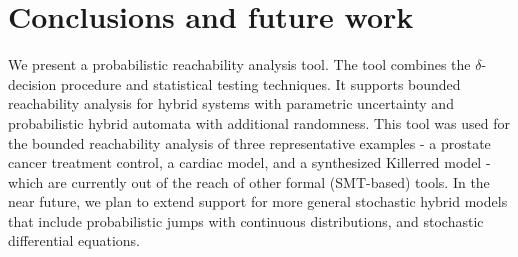 \section{Conclusions and future work}
We present a probabilistic reachability analysis tool. The tool combines the $\delta$-decision 
procedure \cite{gao2013dreal, gao2013satisfiability, gaodelta} and statistical testing techniques. 
It supports bounded reachability analysis for hybrid systems with parametric 
uncertainty and probabilistic hybrid automata with additional randomness. This tool was used for the bounded reachability analysis of three representative examples - a prostate 
cancer treatment control, a cardiac model, and a synthesized Killerred model - which are currently out of the reach of other formal (SMT-based) tools. In the near future, we plan to extend support for more general stochastic hybrid models 
that include probabilistic jumps with continuous distributions, and stochastic differential equations.
